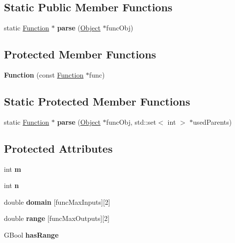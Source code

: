 \subsection*{Static Public Member Functions}
\begin{DoxyCompactItemize}
\item 
\mbox{\label{class_function_aa43a8ea82c3573a7c0c7b40ea58ea128}} 
static \hyperlink{class_function}{Function} $\ast$ {\bfseries parse} (\hyperlink{class_object}{Object} $\ast$func\+Obj)
\end{DoxyCompactItemize}
\subsection*{Protected Member Functions}
\begin{DoxyCompactItemize}
\item 
\mbox{\label{class_function_af5f9fab44f490ec95d06aea99beb528c}} 
{\bfseries Function} (const \hyperlink{class_function}{Function} $\ast$func)
\end{DoxyCompactItemize}
\subsection*{Static Protected Member Functions}
\begin{DoxyCompactItemize}
\item 
\mbox{\label{class_function_a1ed4753bf0905efc7c1b1e15d7b1e4bf}} 
static \hyperlink{class_function}{Function} $\ast$ {\bfseries parse} (\hyperlink{class_object}{Object} $\ast$func\+Obj, std\+::set$<$ int $>$ $\ast$used\+Parents)
\end{DoxyCompactItemize}
\subsection*{Protected Attributes}
\begin{DoxyCompactItemize}
\item 
\mbox{\label{class_function_ace602300f2adca1fcc07fc25326ce301}} 
int {\bfseries m}
\item 
\mbox{\label{class_function_a2f582d2da9cb2af5507a55e17bc44083}} 
int {\bfseries n}
\item 
\mbox{\label{class_function_a3b17b3e90ca1b3cc162f2a79f5a02439}} 
double {\bfseries domain} \mbox{[}func\+Max\+Inputs\mbox{]}\mbox{[}2\mbox{]}
\item 
\mbox{\label{class_function_aae39c230b68a5b8e96145635b1831038}} 
double {\bfseries range} \mbox{[}func\+Max\+Outputs\mbox{]}\mbox{[}2\mbox{]}
\item 
\mbox{\label{class_function_abf8f6a3b30732bbc1ecef56d28b3f4e2}} 
G\+Bool {\bfseries has\+Range}
\end{DoxyCompactItemize}


